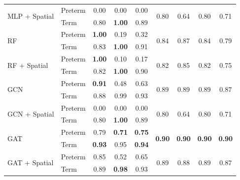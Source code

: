 \documentclass[doubleblind]{ecai}
\begin{document}
\begin{table}[h]
\begin{tabular}{ll|ccc|cccc}
        \hline
        \multirow{2}{*}{MLP + Spatial} 
            & Preterm & 0.00& 0.00& 0.00& \multirow{2}{*}{0.80}& \multirow{2}{*}{0.64}& \multirow{2}{*}{0.80}& \multirow{2}{*}{0.71}\\
            & Term    & 0.80& \textbf{1.00}& 0.89&  &  &  &  \\
        \hline
        \multirow{2}{*}{RF} 
            & Preterm & \textbf{1.00}& 0.19& 0.32& \multirow{2}{*}{0.84}& \multirow{2}{*}{0.87}& \multirow{2}{*}{0.84}& \multirow{2}{*}{0.79}\\
            & Term    & 0.83& \textbf{1.00}& 0.91&  &  &  &  \\
        \hline
        \multirow{2}{*}{RF + Spatial} 
            & Preterm & \textbf{1.00}& 0.10& 0.17& \multirow{2}{*}{0.82}& \multirow{2}{*}{0.85}& \multirow{2}{*}{0.82}& \multirow{2}{*}{0.75}\\
            & Term    & 0.82& \textbf{1.00}& 0.90&  &  &  &  \\
        \hline\hline
        \multirow{2}{*}{GCN}
            & Preterm & \textbf{0.91}& 0.48& 0.63& \multirow{2}{*}{0.89}& \multirow{2}{*}{0.89}& \multirow{2}{*}{0.89}& \multirow{2}{*}{0.87}\\
            & Term    & 0.88& 0.99& 0.93&                        &                        &                        &                        \\
        \hline
        \multirow{2}{*}{GCN + Spatial}
            & Preterm & 0.00& 0.00& 0.00& \multirow{2}{*}{0.80}& \multirow{2}{*}{0.64}& \multirow{2}{*}{0.80}& \multirow{2}{*}{0.71}\\
            & Term    & 0.80& \textbf{1.00}& 0.89&                        &                        &                        &                        \\
        \hline
        \multirow{2}{*}{GAT}
            & Preterm & 0.79& \textbf{0.71}& \textbf{0.75}& \multirow{2}{*}{\textbf{0.90}}& \multirow{2}{*}{\textbf{0.90}}& \multirow{2}{*}{\textbf{0.90}}& \multirow{2}{*}{\textbf{0.90}}\\
            & Term    & \textbf{0.93}& 0.95& \textbf{0.94}&                        &                        &                        &                        \\
        \hline
        \multirow{2}{*}{GAT + Spatial}
            & Preterm & 0.85& 0.52& 0.65& \multirow{2}{*}{0.89}& \multirow{2}{*}{0.88}& \multirow{2}{*}{0.89}& \multirow{2}{*}{0.87}\\
            & Term    & 0.89& \textbf{0.98}& 0.93&                        &                        &                        &                        \\

\end{tabular}
\end{table}
\end{document}
